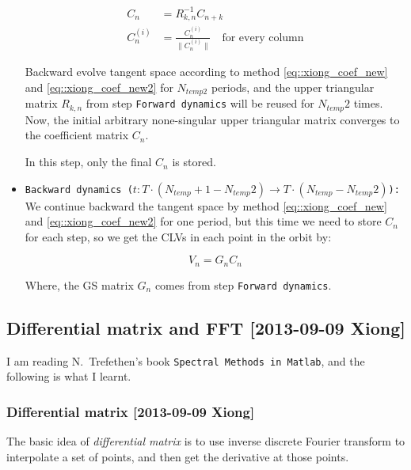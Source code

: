\begin{itemize}
       \begin{align}
       C_{n} & =R_{k,n}^{-1}C_{n+k} \label{eq::xiong_coef_new2}\\
       C_{n}^{(i)} &=\frac{C_{n}^{(i)}}{\| C_{n}^{(i)} \|}\quad \text{for every column}
       \label{eq::xiong_coef_new}
      \end{align}


      Backward evolve tangent space according to method \eqref{eq::xiong_coef_new} and
      \eqref{eq::xiong_coef_new2} for
      $N_{temp2}$ periods, and the upper triangular
      matrix $R_{k,n}$ from step \texttt{Forward dynamics} will be reused for $N_{temp}2$
      times. Now, the initial arbitrary none-singular upper
      triangular matrix converges to the coefficient matrix $C_n$.

      In this step, only the final $C_n$ is stored.

      \item \texttt{Backward dynamics ($t:T \cdot (N_{temp}+1-N_{temp}2)\to T \cdot (N_{temp}-N_{temp}2)$):}
      We continue backward the tangent space by method \eqref{eq::xiong_coef_new} and
      \eqref{eq::xiong_coef_new2} for one period,
      but this time we need to store $C_n$ for each step, so we get the CLVs
      in each point in the orbit by:

      \begin{equation}
       V_{n}=G_{n}C_{n}
      \end{equation}

      Where, the GS matrix $G_{n}$ comes from step \texttt{Forward dynamics}.


    \end{itemize}

\subsection{Differential matrix and FFT [2013-09-09 Xiong]}
  I am reading N.~Trefethen's book \texttt{Spectral Methods in Matlab}, and
  the following is what I learnt.

\subsubsection{Differential matrix [2013-09-09 Xiong]}
The basic idea of \textit{differential matrix} is to use inverse discrete Fourier
transform to interpolate a set of points, and then get the derivative at those
points.

